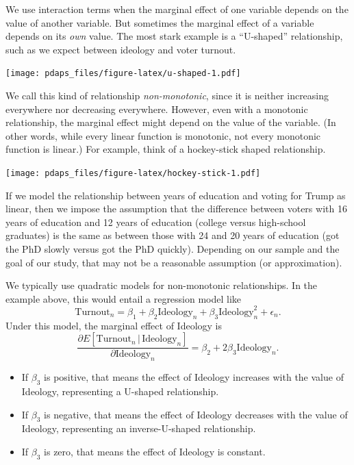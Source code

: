 \documentclass[
  12pt,
  oneside,openany]{book}
\begin{document}
We use interaction terms when the marginal effect of one variable depends on the value of another variable. But sometimes the marginal effect of a variable depends on its \emph{own} value. The most stark example is a ``U-shaped'' relationship, such as we expect between ideology and voter turnout.

\texttt{[image: pdaps\_files/figure-latex/u-shaped-1.pdf]}

We call this kind of relationship \emph{non-monotonic}, since it is neither increasing everywhere nor decreasing everywhere. However, even with a monotonic relationship, the marginal effect might depend on the value of the variable. (In other words, while every linear function is monotonic, not every monotonic function is linear.) For example, think of a hockey-stick shaped relationship.

\texttt{[image: pdaps\_files/figure-latex/hockey-stick-1.pdf]}

If we model the relationship between years of education and voting for Trump as linear, then we impose the assumption that the difference between voters with 16 years of education and 12 years of education (college versus high-school graduates) is the same as between those with 24 and 20 years of education (got the PhD slowly versus got the PhD quickly). Depending on our sample and the goal of our study, that may not be a reasonable assumption (or approximation).

We typically use quadratic models for non-monotonic relationships. In the example above, this would entail a regression model like
\[
\text{Turnout}_n = \beta_1 + \beta_2 \text{Ideology}_n + \beta_3 \text{Ideology}_n^2 + \epsilon_n.
\]
Under this model, the marginal effect of Ideology is
\[
\frac{\partial{}E[\text{Turnout}_n \,|\, \text{Ideology}_n]}{\partial{}\text{Ideology}_n}
= \beta_2 + 2 \beta_3 \text{Ideology}_n.
\]

\begin{itemize}
\item
  If \(\beta_3\) is positive, that means the effect of Ideology increases with the value of Ideology, representing a U-shaped relationship.
\item
  If \(\beta_3\) is negative, that means the effect of Ideology decreases with the value of Ideology, representing an inverse-U-shaped relationship.
\item
  If \(\beta_3\) is zero, that means the effect of Ideology is constant.
\end{itemize}
\end{document}
